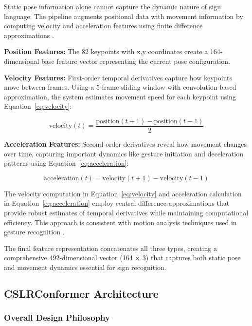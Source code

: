 Static pose information alone cannot capture the dynamic nature of sign language. The pipeline augments positional data with movement information by computing velocity and acceleration features using finite difference approximations \cite{torres2014automatic}.

\textbf{Position Features:} The 82 keypoints with x,y coordinates create a 164-dimensional base feature vector representing the current pose configuration.

\textbf{Velocity Features:} First-order temporal derivatives capture how keypoints move between frames. Using a 5-frame sliding window with convolution-based approximation, the system estimates movement speed for each keypoint using Equation~\ref{eq:velocity}:

\begin{equation}
\text{velocity}(t) = \frac{\text{position}(t+1) - \text{position}(t-1)}{2}
\label{eq:velocity}
\end{equation}

\textbf{Acceleration Features:} Second-order derivatives reveal how movement changes over time, capturing important dynamics like gesture initiation and deceleration patterns using Equation~\ref{eq:acceleration}:

\begin{equation}
\text{acceleration}(t) = \text{velocity}(t+1) - \text{velocity}(t-1)
\label{eq:acceleration}
\end{equation}

The velocity computation in Equation~\ref{eq:velocity} and acceleration calculation in Equation~\ref{eq:acceleration} employ central difference approximations that provide robust estimates of temporal derivatives while maintaining computational efficiency. This approach is consistent with motion analysis techniques used in gesture recognition \cite{huang2024video}.

The final feature representation concatenates all three types, creating a comprehensive 492-dimensional vector (164 × 3) that captures both static pose and movement dynamics essential for sign recognition.

\subsection{CSLRConformer Architecture}

\subsubsection{Overall Design Philosophy}

